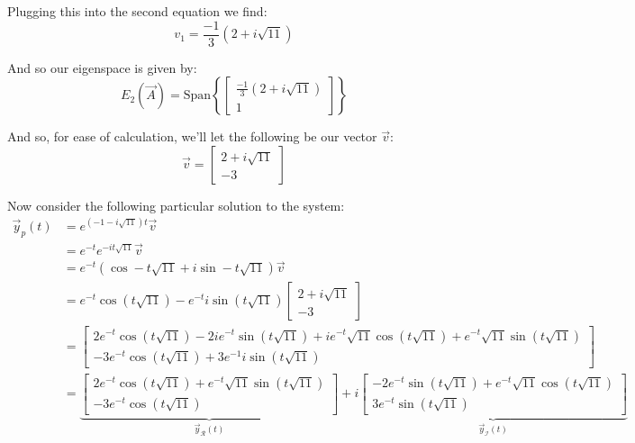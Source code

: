 \documentclass{article}
\begin{document}
Plugging this into the second equation we find:
\begin{equation*}
  v_1=\frac{-1}{3}(2+i\sqrt{11})
\end{equation*}

And so our eigenspace is given by:
\begin{equation*}
  E_2(\vec A)=\text{Span}\left\{\begin{bmatrix}
    \frac{-1}{3}(2+i\sqrt{11})\\1
  \end{bmatrix}\right\}
\end{equation*}

And so, for ease of calculation, we'll let the following be our vector $\vec v$:
\begin{equation*}
  \vec v=\begin{bmatrix}
    2+i\sqrt{11}\\-3
  \end{bmatrix}
\end{equation*}

Now consider the following particular solution to the system:
\begin{align*}
  \vec y_p(t)&=e^{(-1-i\sqrt{11})t}\vec v\tag{straight line solution}\\
  &=e^{-t}e^{-it\sqrt{11}}\vec v\\
  &=e^{-t}(\cos -t\sqrt{11}+i\sin -t\sqrt{11})\vec v\tag{Euler's formula}\\
  &=e^{-t}\cos(t\sqrt{11})-e^{-t}i\sin(t\sqrt{11})\begin{bmatrix}
    2+i\sqrt{11}\\-3
  \end{bmatrix}\\
  &=\begin{bmatrix}
    2e^{-t}\cos(t\sqrt{11})-2ie^{-t}\sin(t\sqrt{11})+ie^{-t}\sqrt{11}\cos(t\sqrt{11})+e^{-t}\sqrt{11}\sin(t\sqrt{11})\\-3e^{-t}\cos(t\sqrt{11})+3e^{-1}i\sin(t\sqrt{11})
  \end{bmatrix}\\
  &=\underbrace{\begin{bmatrix}
    2e^{-t}\cos(t\sqrt{11})+e^{-t}\sqrt{11}\sin(t\sqrt{11})\\-3e^{-t}\cos(t\sqrt{11})
  \end{bmatrix}}_{\vec y_\mathcal R(t)}
  +i\underbrace{\begin{bmatrix}
    -2e^{-t}\sin(t\sqrt{11})+e^{-t}\sqrt{11}\cos(t\sqrt{11})\\3e^{-t}\sin(t\sqrt{11})
  \end{bmatrix}}_{\vec y_\mathcal I(t)}
\end{align*}
\end{document}
